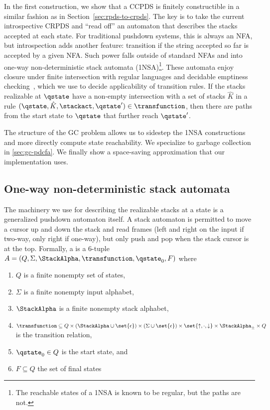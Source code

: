 In the first construction, we show that a CCPDS is finitely constructible in a similar fashion as in Section~\ref{sec:rpds-to-crpds}.
The key is to take the current introspective CRPDS and ``read off'' an automaton that describes the stacks accepted at each state.
For traditional pushdown systems, this is always an NFA, but introspection adds another feature: transition if the string accepted so far is accepted by a given NFA.
Such power falls outside of standard NFAs and into one-way non-deterministic stack automata (1NSA)\footnote{The reachable states of a 1NSA is known to be regular, but the paths are not.}.
These automata enjoy closure under finite intersection with regular languages and decidable emptiness checking~\citep{ianjohnson:one-way-sa:ginsburg:1967}, which we use to decide applicability of transition rules.
If the stacks realizable at $\qstate$ have a non-empty intersection with a set of stacks $\hat K$ in a rule $(\qstate, \hat K, \stackact, \qstate') \in \transfunction$, then there are paths from the start state to $\qstate$ that further reach $\qstate'$.

The structure of the GC problem allows us to sidestep the 1NSA constructions and more directly compute state reachability.
We specialize to garbage collection in \autoref{sec:gc-pdcfa}.
We finally show a space-saving approximation that our implementation uses.


\subsection{One-way non-deterministic stack automata}

The machinery we use for describing the realizable stacks at a state is a generalized pushdown automaton itself.
A stack automaton is permitted to move a cursor up and down the stack and read frames (left and right on the input if two-way, only right if one-way), but only push and pop when the stack cursor is at the top.
Formally, a  is a 6-tuple $A = (Q, \Sigma, \StackAlpha, \transfunction, \qstate_0, F)$ where
\begin{enumerate}
\item $Q$ is a finite nonempty set of states,
\item $\Sigma$ is a finite nonempty input alphabet,
\item $\StackAlpha$ is a finite nonempty stack alphabet,
\item $\transfunction \subseteq Q \times (\StackAlpha \cup \set{\epsilon}) \times (\Sigma \cup \set{\epsilon}) \times \set{\uparrow, \cdot, \downarrow} \times \StackAlpha_\pm \times Q$ is the transition relation,
\item $\qstate_0 \in Q$ is the start state, and
\item $F \subseteq Q$ the set of final states
\end{enumerate}

